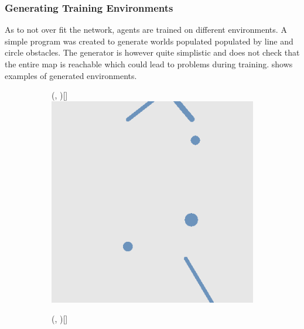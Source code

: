 \subsubsection{Generating Training Environments}
As to not over fit the network, agents are trained on different environments. A simple program was created to generate worlds populated populated by line and circle obstacles. The generator is however quite simplistic and does not check that the entire map is reachable which could lead to problems during training.  shows examples of generated environments. 

\def\w{0.31\textwidth}
\begin{figure}[H]
    \begin{subfigure}{\w}
        \makebox(\textwidth, \textwidth)[\textwidth]{
            \includegraphics[width=\linewidth]{figures/generated-worlds/world_0.png}
        }
    \end{subfigure}
    \hspace*{\fill}
    \begin{subfigure}{\w}
        \makebox(\textwidth, \textwidth)[\textwidth]{
}
\end{subfigure}
\end{figure}
